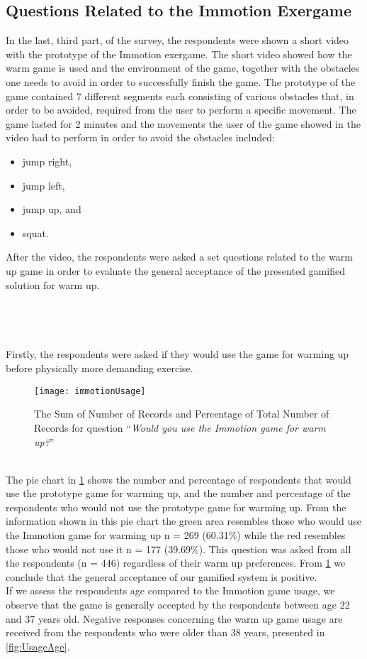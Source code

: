 \subsection{Questions Related to the Immotion Exergame}
In the last, third part, of the survey, the respondents were shown a short video with the prototype of the Immotion exergame. The short video showed how the warm game is used and the environment of the game, together with the obstacles one needs to avoid in order to successfully finish the game. The prototype of the game contained 7 different segments each consisting of various obstacles that, in order to be avoided, required from the user to perform a specific movement. The game lasted for 2 minutes and the movements the user of the game showed in the video had to perform in order to avoid the obstacles included: 
\begin{itemize}
\item jump right,
\item jump left,
\item jump up, and
\item squat.
\end{itemize}
After the video, the respondents were asked a set questions related to the warm up game in order to evaluate the general acceptance of the presented gamified solution for warm up.\\\\\\\\\\ Firstly, the respondents were asked if they would use the game for warming up before physically more demanding exercise. \\
\begin{figure}[h]
    \centering
    \texttt{[image: immotionUsage]}
    \caption{The Sum of Number of Records and Percentage of Total Number of Records for question ``\textit{Would you use the Immotion game for warm up?}''}
    \label{fig:immotionUsage}
\end{figure}\\
The pie chart in \ref{fig:immotionUsage} shows the number and percentage of respondents that would use the prototype game for warming up, and the number and percentage of the respondents who would not use the prototype game for warming up. From the information shown in this pie chart the green area resembles those who would use the Immotion game for warming up n = 269 (60.31\%) while the red resembles those who would not use it n = 177 (39.69\%). This question was asked from all the respondents (n = 446) regardless of their warm up preferences. From \ref{fig:immotionUsage} we conclude that the general acceptance of our gamified system is positive.\\ If we assess the respondents age compared to the Immotion game usage, we observe that the game is generally accepted by the respondents between age 22 and 37 years old. Negative responses concerning the warm up game usage are received from the respondents who were older than 38 years, presented in \ref{fig:UsageAge}.\\
